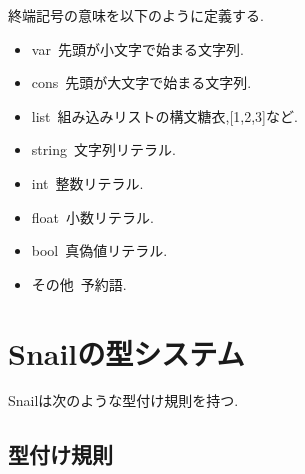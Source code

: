 \documentclass{jsarticle}
\begin{document}
終端記号の意味を以下のように定義する.

\begin{itemize}
  \item var\ 先頭が小文字で始まる文字列.
  \item cons\ 先頭が大文字で始まる文字列.
  \item list\ 組み込みリストの構文糖衣,[1,2,3]など.
  \item string\ 文字列リテラル.
  \item int\ 整数リテラル.
  \item float\ 小数リテラル.
  \item bool\ 真偽値リテラル.
  \item その他\ 予約語.
\end{itemize}

\newpage

\section{Snailの型システム}

Snailは次のような型付け規則を持つ.

\subsection{型付け規則}
\end{document}
